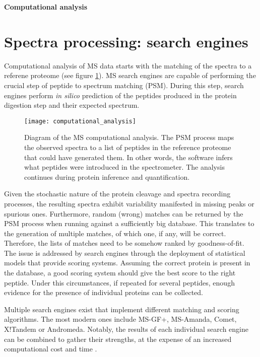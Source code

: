 \documentclass[thesis]{subfiles}
\begin{document}
 
\LARGE
\textbf{Computational analysis}
\normalsize

\section{Spectra processing: search engines}
\label{sec:search_engines}

Computational analysis of MS data starts with the matching of the spectra to a referene proteome (see figure \ref{fig:computational_analysis}). \ac{MS} search engines are capable of performing the crucial step of peptide to spectrum matching (PSM). During this step, search engines perform \textit{in silico} prediction of the peptides produced in the protein digestion step and their expected spectrum.


\begin{figure}[!h]
\texttt{[image: computational\_analysis]}
\caption{Diagram of the MS computational analysis. The PSM process maps the observed spectra to a list of peptides in the reference proteome that could have generated them. In other words, the software infers what peptides were introduced in the spectrometer. The analysis continues during protein inference and quantification.}
\label{fig:computational_analysis}
\end{figure}


Given the stochastic nature of the protein cleavage and spectra recording processes, the resulting spectra exhibit variability manifested in missing peaks or spurious ones. Furthermore, random (wrong) matches can be returned by the PSM process when running against a sufficiently big database. This translates to the generation of multiple matches, of which one, if any, will be correct. Therefore, the lists of matches need to be somehow ranked by goodness-of-fit. The issue is addressed by search engines through the deployment of statistical models that provide scoring systems. Assuming the correct protein is present in the database, a good scoring system should give the best score to the right peptide. Under this circumstances, if repeated for several peptides, enough evidence for the presence of individual proteins can be collected.

Multiple search engines exist that implement different matching and scoring algorithms. The most modern ones include MS-GF+, MS-Amanda, Comet, X!Tandem or Andromeda. Notably, the results of each individual search engine can be combined to gather their strengths, at the expense of an increased computational cost and time \cite{Shteynberg2013}.
\end{document}
